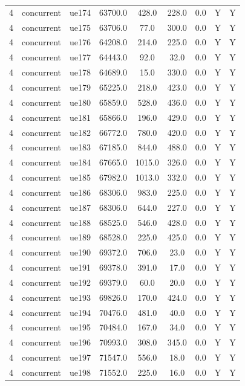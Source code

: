 \begin{table}[ht]
\begin{tabular}{|c|c|c|c|c|c|c|c|c|}
4 & concurrent & ue174 & 63700.0 & 428.0 & 228.0 & 0.0 & Y & Y \\
4 & concurrent & ue175 & 63706.0 & 77.0 & 300.0 & 0.0 & Y & Y \\
4 & concurrent & ue176 & 64208.0 & 214.0 & 225.0 & 0.0 & Y & Y \\
4 & concurrent & ue177 & 64443.0 & 92.0 & 32.0 & 0.0 & Y & Y \\
4 & concurrent & ue178 & 64689.0 & 15.0 & 330.0 & 0.0 & Y & Y \\
4 & concurrent & ue179 & 65225.0 & 218.0 & 423.0 & 0.0 & Y & Y \\
4 & concurrent & ue180 & 65859.0 & 528.0 & 436.0 & 0.0 & Y & Y \\
4 & concurrent & ue181 & 65866.0 & 196.0 & 429.0 & 0.0 & Y & Y \\
4 & concurrent & ue182 & 66772.0 & 780.0 & 420.0 & 0.0 & Y & Y \\
4 & concurrent & ue183 & 67185.0 & 844.0 & 488.0 & 0.0 & Y & Y \\
4 & concurrent & ue184 & 67665.0 & 1015.0 & 326.0 & 0.0 & Y & Y \\
4 & concurrent & ue185 & 67982.0 & 1013.0 & 332.0 & 0.0 & Y & Y \\
4 & concurrent & ue186 & 68306.0 & 983.0 & 225.0 & 0.0 & Y & Y \\
4 & concurrent & ue187 & 68306.0 & 644.0 & 227.0 & 0.0 & Y & Y \\
4 & concurrent & ue188 & 68525.0 & 546.0 & 428.0 & 0.0 & Y & Y \\
4 & concurrent & ue189 & 68528.0 & 225.0 & 425.0 & 0.0 & Y & Y \\
4 & concurrent & ue190 & 69372.0 & 706.0 & 23.0 & 0.0 & Y & Y \\
4 & concurrent & ue191 & 69378.0 & 391.0 & 17.0 & 0.0 & Y & Y \\
4 & concurrent & ue192 & 69379.0 & 60.0 & 20.0 & 0.0 & Y & Y \\
4 & concurrent & ue193 & 69826.0 & 170.0 & 424.0 & 0.0 & Y & Y \\
4 & concurrent & ue194 & 70476.0 & 481.0 & 40.0 & 0.0 & Y & Y \\
4 & concurrent & ue195 & 70484.0 & 167.0 & 34.0 & 0.0 & Y & Y \\
4 & concurrent & ue196 & 70993.0 & 308.0 & 345.0 & 0.0 & Y & Y \\
4 & concurrent & ue197 & 71547.0 & 556.0 & 18.0 & 0.0 & Y & Y \\
4 & concurrent & ue198 & 71552.0 & 225.0 & 16.0 & 0.0 & Y & Y \\

\end{tabular}
\end{table}
